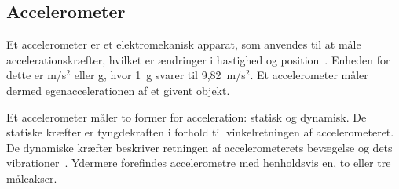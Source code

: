 \subsection{Accelerometer}
Et accelerometer er et elektromekanisk apparat, som anvendes til at måle accelerationskræfter, hvilket er ændringer i hastighed og position~\citep{Goodrich2013,TittertonWeston2004}. Enheden for dette er m/s$^2$ eller g, hvor 1~g svarer til 9,82~m/s$^2$. Et accelerometer måler dermed egenaccelerationen af et givent objekt.~\citep{Sparkfun,TittertonWeston2004}

Et accelerometer måler to former for acceleration: statisk og dynamisk. De statiske kræfter er tyngdekraften i forhold til vinkelretningen af accelerometeret. De dynamiske kræfter beskriver retningen af accelerometerets bevægelse og dets vibrationer~\citep{Sparkfun,Goodrich2013,Engineering}. Ydermere forefindes accelerometre med henholdsvis en, to eller tre måleakser.~\citep{TittertonWeston2004} 

